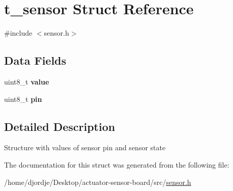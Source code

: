 \hypertarget{structt__sensor}{}\section{t\+\_\+sensor Struct Reference}
\label{structt__sensor}


{\ttfamily \#include $<$sensor.\+h$>$}

\subsection*{Data Fields}
\begin{DoxyCompactItemize}
\item 
\mbox{\label{structt__sensor_a638e4503e0ae6ce655b7ad2e17e8f0ad}} 
uint8\+\_\+t {\bfseries value}
\item 
\mbox{\label{structt__sensor_ab40a673fb19c1e650e1f79de91788aa5}} 
uint8\+\_\+t {\bfseries pin}
\end{DoxyCompactItemize}


\subsection{Detailed Description}
Structure with values of sensor pin and sensor state 

The documentation for this struct was generated from the following file\+:\begin{DoxyCompactItemize}
\item 
/home/djordje/\+Desktop/actuator-\/sensor-\/board/src/\mbox{\hyperlink{sensor_8h}{sensor.\+h}}\end{DoxyCompactItemize}
